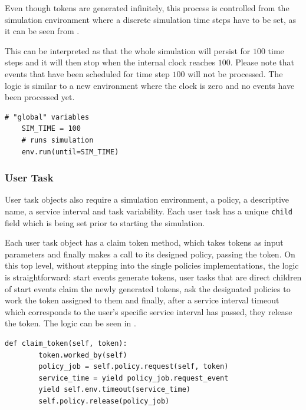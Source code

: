 \documentclass[draft=false]{seal_thesis}
\begin{document}
Even though tokens are generated infinitely, this process is controlled from the simulation environment where a discrete simulation time steps have to be set, as it can be seen from .

This can be interpreted as that the whole simulation will persist for $100$ time steps and it will then stop when the internal clock reaches $100$. Please note that events that have been scheduled for time step $100$ will not be processed. The logic is similar to a new environment where the clock is zero and no events have been processed yet.

\begin{lstlisting}[caption=Starting the simulation with discrete time steps,label=lst:simulation_steps,style=CustomPython]
    # "global" variables
    SIM_TIME = 100
    # runs simulation
    env.run(until=SIM_TIME)
\end{lstlisting}

\subsubsection{User Task}
\label{subsec:user_task}

User task objects also require a simulation environment, a policy, a descriptive name, a service interval and task variability. Each user task has a unique \texttt{child} field which is being set prior to starting the simulation.

Each user task object has a claim token method, which takes tokens as input parameters and finally makes a call to its designed policy, passing the token. On this top level, without stepping into the single policies implementations, the logic is straightforward: start events generate tokens, user tasks that are direct children of start events claim the newly generated tokens, ask the designated policies to work the token assigned to them and finally, after a service interval timeout which corresponds to the user's specific service interval has passed, they release the token. The logic can be seen in .

\begin{lstlisting}[caption=User task claim method,label=lst:user_task,style=CustomPython]
    def claim_token(self, token):
        token.worked_by(self)
        policy_job = self.policy.request(self, token)
        service_time = yield policy_job.request_event
        yield self.env.timeout(service_time)
        self.policy.release(policy_job)
\end{lstlisting}
\end{document}
